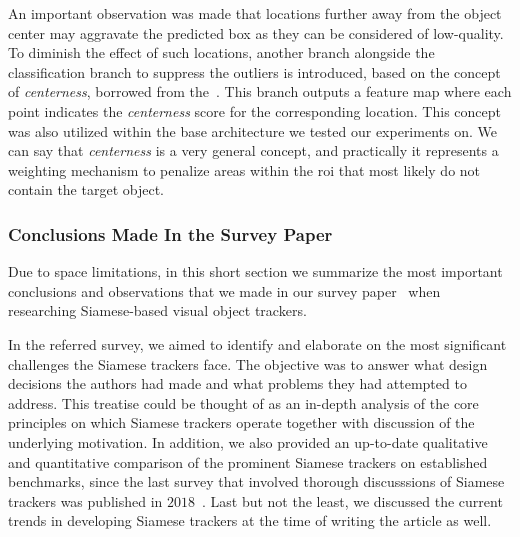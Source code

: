 An important observation was made that locations further away from the object center may aggravate the predicted box as they can be considered of low-quality. To diminish the effect of such locations, another branch alongside the classification branch to suppress the outliers is introduced, based on the concept of \emph{centerness}, borrowed from the~\cite{tian2019fcos}. This branch outputs a feature map where each point indicates the \emph{centerness} score for the corresponding location. This concept was also utilized within the base architecture we tested our experiments on. We can say that \emph{centerness} is a very general concept, and practically it represents a weighting mechanism to penalize areas within the \gls{roi} that most likely do not contain the target object.

\subsubsection{Conclusions Made In the Survey Paper}

Due to space limitations, in this short section we summarize the most important conclusions and observations that we made in our survey paper~\cite{ondrasovic2021siamese} when researching Siamese-based visual object trackers.

In the referred survey, we aimed to identify and elaborate on the most significant challenges the Siamese trackers face. The objective was to answer what design decisions the authors had made and what problems they had attempted to address. This treatise could be thought of as an in-depth analysis of the core principles on which Siamese trackers operate together with discussion of the underlying motivation. In addition, we also provided an up-to-date qualitative and quantitative comparison of the prominent Siamese trackers on established benchmarks, since the last survey that involved thorough discusssions of Siamese trackers was published in $2018$~\cite{pflugfelder2018indepth}. Last but not the least, we discussed the current trends in developing Siamese trackers at the time of writing the article as well.

